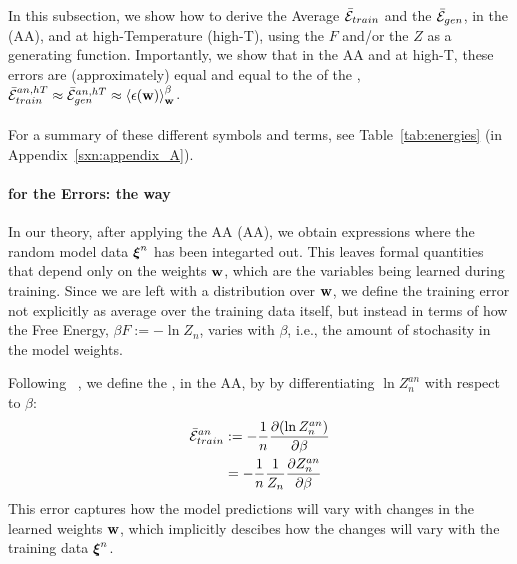 
In this subsection, we show how to derive the Average \TrainingError $\bar{\mathcal{E}}_{train}$ and  the \AverageGeneralizationError $\bar{\mathcal{E}}_{gen}$,
in the \AnnealedApproximation (AA), and at high-Temperature (high-T), using the \FreeEnergy $F$ and/or the \PartitionFunction $Z$ as
a generating function.  Importantly, we show that in the AA and at high-T, these errors are (approximately) equal
and equal to the \ThermalAverage of the \EffectivePotential,
$\bar{\mathcal{E}}_{train}^{an, hT} \approx \bar{\mathcal{E}}_{gen}^{an, hT} \approx \left\langle \epsilon({\mathbf{w}}) \right\rangle_{\mathbf w}^{\beta}$.
\\
\\
For a summary of these different symbols and terms, see Table~\ref{tab:energies} (in Appendix~\ref{sxn:appendix_A}).

\paragraph{\GeneratingFunctions for the Errors: the \STATMECH way}

In our theory, after applying the AA (AA), we obtain expressions where the
random model data $\boldsymbol{\xi}^{n}$ has been integarted out. This leaves formal quantities
that depend only on the weights ${\mathbf{w}}$, which are the variables being learned during training.
Since we are left with a distribution over ${\mathbf{w}}$,
we define the training error not explicitly as average over the training data itself,
but instead in terms of how the Free Energy,  $\beta F :=-\ln Z_{n}$,
varies  with $\beta$, i.e., the amount of stochasity in the model weights.

Following ~\cite{LTS90, Solla2023},
we define the \emph{\AverageTrainingError}, in the AA,
by by differentiating $\ln Z^{an}_{n}$ with respect to $\beta$:
\begin{align}
  \label{eqn:avgte_def}
  \bar{\mathcal{E}}_{train}^{an}
  & := -\frac{1}{n}\dfrac{\partial (\ln Z^{an}_{n})}{\partial \beta} \\ \nonumber
  &  = -\frac{1}{n}\frac{1}{Z_{n}}\dfrac{\partial Z^{an}_{n}}{\partial \beta} 
\end{align}
This error captures how the model predictions will vary with changes in the learned
weights ${\mathbf{w}}$, which implicitly descibes how the changes will vary with the
training data $\boldsymbol{\xi}^{n}$.

